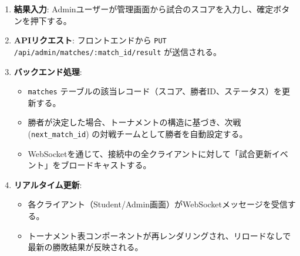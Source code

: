 \documentclass[paper=a4, fontsize=11pt]{jlreq}
\begin{document}
\begin{enumerate}
    \item \textbf{結果入力}: Adminユーザーが管理画面から試合のスコアを入力し、確定ボタンを押下する。
    \item \textbf{APIリクエスト}: フロントエンドから \texttt{PUT /api/admin/matches/:match\_id/result} が送信される。
    \item \textbf{バックエンド処理}:
    \begin{itemize}
        \item \texttt{matches} テーブルの該当レコード（スコア、勝者ID、ステータス）を更新する。
        \item 勝者が決定した場合、トーナメントの構造に基づき、次戦 (\texttt{next\_match\_id}) の対戦チームとして勝者を自動設定する。
        \item WebSocketを通じて、接続中の全クライアントに対して「試合更新イベント」をブロードキャストする。
    \end{itemize}
    \item \textbf{リアルタイム更新}:
    \begin{itemize}
        \item 各クライアント（Student/Admin画面）がWebSocketメッセージを受信する。
        \item トーナメント表コンポーネントが再レンダリングされ、リロードなしで最新の勝敗結果が反映される。
    \end{itemize}
\end{enumerate}
\end{document}

